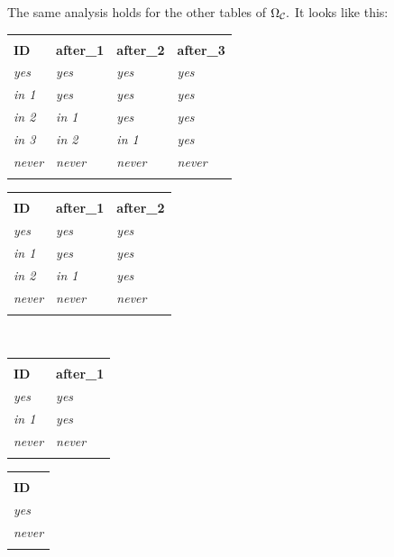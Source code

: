\documentclass[CT4S-EN-RU]{subfiles}
\begin{document}
\begin{exampleENG}
The same analysis holds for the other tables of $\Omega_\mathcal{C}.$ It looks like this:
\begin{center}
\begin{tabular}{| l || l | l | l |}
\bhline
\multicolumn{4}{|c|}{$\Omega_\mcC({\tt 0})$}\\\bhline
{\bf ID}&{\bf after\_1}&{\bf after\_2}&{\bf after\_3}\\\bbhline
{\it yes}&{\it yes}&{\it yes}&{\it yes}\\\hline
{\it in 1}&{\it yes}&{\it yes}&{\it yes}\\\hline
{\it in 2}&{\it in 1}&{\it yes}&{\it yes}\\\hline
{\it in 3}&{\it in 2}&{\it in 1}&{\it yes}\\\hline
{\it never}&{\it never}&{\it never}&{\it never}\\\bhline
\end{tabular}
\hsp
\begin{tabular}{| l || l | l |}
\bhline
\multicolumn{3}{|c|}{$\Omega_\mcC({\tt 1})$}\\\bhline
{\bf ID}&{\bf after\_1}&{\bf after\_2}\\\bbhline
{\it yes}&{\it yes}&{\it yes}\\\hline
{\it in 1}&{\it yes}&{\it yes}\\\hline
{\it in 2}&{\it in 1}&{\it yes}\\\hline
{\it never}&{\it never}&{\it never}\\\bhline
\end{tabular}\\\vspace{.2in}
\begin{tabular}{| l || l |}
\bhline
\multicolumn{2}{|c|}{$\Omega_\mcC({\tt 2})$}\\\bhline
{\bf ID}&{\bf after\_1}\\\bbhline
{\it yes}&{\it yes}\\\hline
{\it in 1}&{\it yes}\\\hline
{\it never}&{\it never}\\\bhline
\end{tabular}
\hsp
\begin{tabular}{| l ||}
\bhline
\multicolumn{1}{|c|}{$\Omega_\mcC({\tt 3})$}\\\bhline
{\bf ID}\\\bbhline
{\it yes}\\\hline
{\it never}\\\bhline
\end{tabular}


\end{center}
\end{exampleENG}
\end{document}

